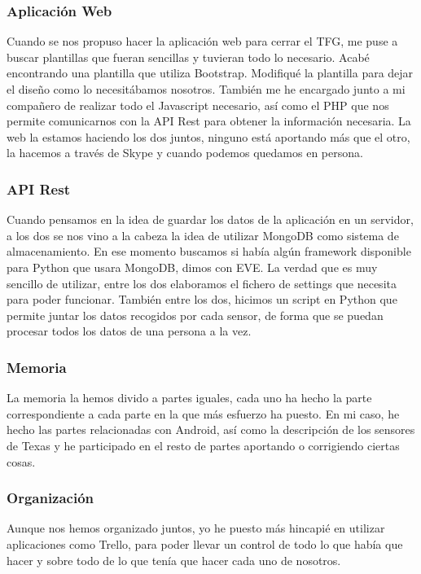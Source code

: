 \documentclass[11pt,spanish]{article}
\begin{document}
\subsubsection{Aplicación Web} 
Cuando se nos propuso hacer la aplicación web para cerrar el TFG, me puse a buscar plantillas que fueran sencillas y tuvieran todo lo necesario. Acabé encontrando una plantilla que utiliza Bootstrap. Modifiqué la plantilla para dejar el diseño como lo necesitábamos nosotros. También me he encargado junto a mi compañero de realizar todo el Javascript necesario, así como el PHP que nos permite comunicarnos con la API Rest para obtener la información necesaria. La web la estamos haciendo los dos juntos, ninguno está aportando más que el otro, la hacemos a través de Skype y cuando podemos quedamos en persona.

\subsubsection{API Rest} 
Cuando pensamos en la idea de guardar los datos de la aplicación en un servidor, a los dos se nos vino a la cabeza la idea de utilizar MongoDB como sistema de almacenamiento. En ese momento buscamos si había algún framework disponible para Python que usara MongoDB, dimos con EVE. La verdad que es muy sencillo de utilizar, entre los dos elaboramos el fichero de settings que necesita para poder funcionar. También entre los dos, hicimos un script en Python que permite juntar los datos recogidos por cada sensor, de forma que se puedan procesar todos los datos de una persona a la vez.

\subsubsection{Memoria} 
La memoria la hemos divido a partes iguales, cada uno ha hecho la parte correspondiente a cada parte en la que más esfuerzo ha puesto. En mi caso, he hecho las partes relacionadas con Android, así como la descripción de los sensores de Texas y he participado en el resto de partes aportando o corrigiendo ciertas cosas.

\subsubsection{Organización}
Aunque nos hemos organizado juntos, yo he puesto más hincapié en utilizar aplicaciones como Trello, para poder llevar un control de todo lo que había que hacer y sobre todo de lo que tenía que hacer cada uno de nosotros.
\end{document}
